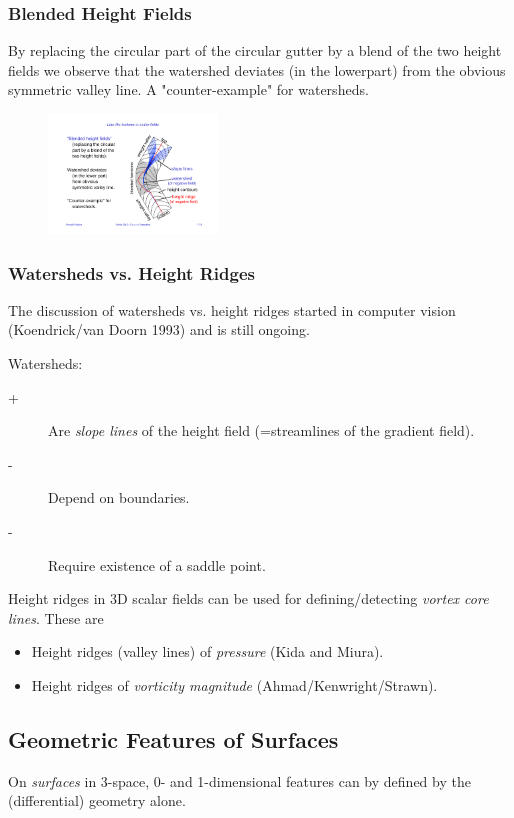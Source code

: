 \subsubsection{Blended Height Fields}
By replacing the circular part of the circular gutter by a blend of the two height fields we observe that the watershed deviates (in the lowerpart) from the obvious symmetric valley line. A "counter-example" for watersheds.
\begin{figure}[H]
    \centering
    \includegraphics[width=0.4\textwidth]{img/07_blended_height_fields_example}
\end{figure}

\subsubsection{Watersheds vs. Height Ridges}
The discussion of watersheds vs. height ridges started in computer vision (Koendrick/van Doorn 1993) and is still ongoing.

Watersheds:
\begin{description}
\item[+] Are \emph{slope lines} of the height field (=streamlines of the gradient field).
\item[-] Depend on boundaries.
\item[-] Require existence of a saddle point.
\end{description}

Height ridges in 3D scalar fields can be used for defining/detecting \emph{vortex core lines}. These are
\begin{itemize}
    \item Height ridges (valley lines) of \emph{pressure} (Kida and Miura).
    \item Height ridges of \emph{vorticity magnitude} (Ahmad/Kenwright/Strawn).
\end{itemize}

\subsection{Geometric Features of Surfaces}
On \emph{surfaces} in 3-space, 0- and 1-dimensional features can by defined by the (differential) geometry alone. 


